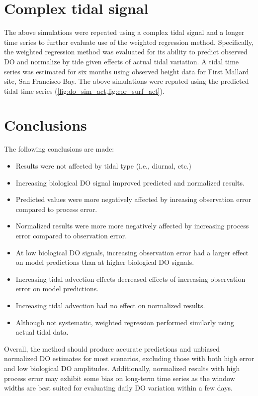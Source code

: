 \documentclass{article}\usepackage[]{graphicx}\usepackage[]{color}
\begin{document}
\section{Complex tidal signal}

The above simulations were repeated using a complex tidal signal and a longer time series to further evaluate use of the weighted regression method.  Specifically, the weighted regression method was evaluated for its ability to predict observed DO and normalize by tide given effects of actual tidal variation.  A tidal time series was estimated for six months using observed height data for First Mallard site, San Francisco Bay.  The above simulations were repated using the predicted tidal time series (\cref{fig:do_sim_act,fig:cor_surf_act}).    

\section{Conclusions}
The following conclusions are made: 
\begin{itemize}
\item Results were not affected by tidal type (i.e., diurnal, etc.)
\item Increasing biological DO signal improved predicted and normalized results.
\item Predicted values were more negatively affected by inreasing observation error compared to process error.
\item Normalized results were more more negatively affected by increasing process error compared to observation error.
\item At low biological DO signals, increasing observation error had a larger effect on model predictions than at higher biological DO signals.
\item Increasing tidal advection effects decreased effects of increasing observation error on model predictions.
\item Increasing tidal advection had no effect on normalized results.
\item Although not systematic, weighted regression performed similarly using actual tidal data.
\end{itemize}
Overall, the method should produce accurate predictions and unbiased normalized DO estimates for most scenarios, excluding those with both high error and low biological DO amplitudes.  Additionally, normalized results with high process error may exhibit some bias on long-term time series as the window widths are best suited for evaluating daily DO variation within a few days.   
\end{document}
